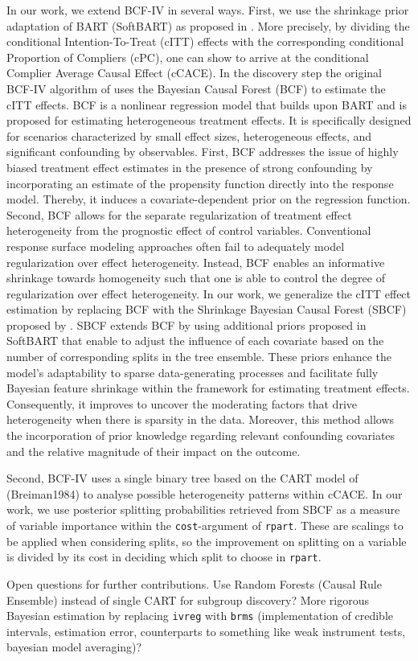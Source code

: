 In our work, we extend BCF-IV in several ways. First, we use the shrinkage prior adaptation of BART (SoftBART) as proposed in \citep{linero_bayesian_2018,linero_bayesian_2018-1}.
More precisely, by dividing the conditional Intention-To-Treat (cITT) effects with the corresponding conditional Proportion of Compliers (cPC), one can show to arrive at the conditional Complier Average Causal Effect (cCACE).
In the discovery step the original BCF-IV algorithm of \citep{bargagli-stoffi_heterogeneous_2022} uses the Bayesian Causal Forest (BCF) \citep{hahn_bayesian_2020} to estimate the cITT effects.  
BCF is a nonlinear regression model that builds upon BART and is proposed for estimating heterogeneous treatment effects. It is specifically designed for scenarios characterized by small effect sizes, heterogeneous effects, and significant confounding by observables.
First, BCF addresses the issue of highly biased treatment effect estimates in the presence of strong confounding by incorporating an estimate of the propensity function directly into the response model. 
Thereby, it induces a covariate-dependent prior on the regression function. 
Second, BCF allows for the separate regularization of treatment effect heterogeneity from the prognostic effect of control variables. 
Conventional response surface modeling approaches often fail to adequately model regularization over effect heterogeneity.
Instead, BCF enables an informative shrinkage towards homogeneity such that one is able to control the degree of regularization over effect heterogeneity.
In our work, we generalize the cITT effect estimation by replacing BCF with the Shrinkage Bayesian Causal Forest (SBCF) proposed by \citep{caron_shrinkage_2022}.
SBCF extends BCF by using additional priors proposed in SoftBART that enable to adjust the influence of each covariate based on the number of corresponding splits in the tree ensemble.
These priors enhance the model's adaptability to sparse data-generating processes and facilitate fully Bayesian feature shrinkage within the framework for estimating treatment effects.
Consequently, it improves to uncover the moderating factors that drive heterogeneity when there is sparsity in the data.  
Moreover, this method allows the incorporation of prior knowledge regarding relevant confounding covariates and the relative magnitude of their impact on the outcome.

Second, BCF-IV uses a single binary tree based on the CART model of (Breiman1984) to analyse possible heterogeneity patterns within cCACE.
In our work, we use posterior splitting probabilities retrieved from SBCF as a measure of variable importance within the \texttt{cost}-argument of \texttt{rpart}. 
These are scalings to be applied when considering splits, so the improvement on splitting on a variable is divided by its cost in deciding which split to choose in \texttt{rpart}.


Open questions for further contributions. Use Random Forests (Causal Rule Ensemble) instead of single CART for subgroup discovery? 
More rigorous Bayesian estimation by replacing \texttt{ivreg} with \texttt{brms} (implementation of credible intervals, estimation error, counterparts to something like weak instrument tests, bayesian model averaging)? 




